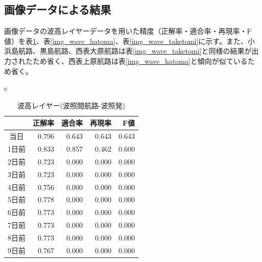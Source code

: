 \begin{table}[htbp]
\begin{center}
\begin{tabular}{c}
    \end{tabular}
  \end{center}
\end{table}




\subsection{画像データによる結果}
画像データの波高レイヤーデータを用いた精度（正解率・適合率・再現率・F値）を表\ref{img_wave_hateruma}、表\ref{img_wave_hatoma}、表\ref{img_wave_taketomi}に示す。また、小浜島航路、黒島航路、西表大原航路は表\ref{img_wave_taketomi}と同様の結果が出力されたため省く、西表上原航路は表\ref{img_wave_hatoma}と傾向が似ているため省く。


\begin{table}[htbp]
  \begin{center}
    \begin{tabular}{c}
      \begin{minipage}{0.5\hsize}
        \begin{center}
          \caption{波高レイヤー(波照間航路-波照発)}
          \begin{tabular}{|c|r|r|r|r|} \hline
   &正解率 & 適合率 & 再現率 & F値 \\ \hline
      当日&0.796 &0.643 &0.643 &0.643 \\ \hline
     1日前 & 0.833 & 0.857 & 0.462 & 0.600 \\ \hline
      2日前 & 0.723 & 0.000 & 0.000 & 0.000 \\ \hline
      3日前 & 0.723 & 0.000 & 0.000 & 0.000 \\ \hline 
      4日前 & 0.756 & 0.000 & 0.000 & 0.000 \\ \hline 
      5日前 & 0.778 & 0.000 & 0.000 & 0.000 \\ \hline 
      6日前 & 0.773 & 0.000 & 0.000 & 0.000 \\ \hline 
      7日前 & 0.773 & 0.000 & 0.000 & 0.000 \\ \hline 
      8日前 & 0.773 & 0.000 & 0.000 & 0.000 \\ \hline 
      9日前 & 0.767 & 0.000 & 0.000 & 0.000 \\ \hline 
          \end{tabular}
          \label{img_wave_hateruma}
        \end{center}
      \end{minipage}
      \begin{minipage}{0.5\hsize}
        \begin{center}

\end{center}
\end{minipage}
\end{tabular}
\end{center}
\end{table}
